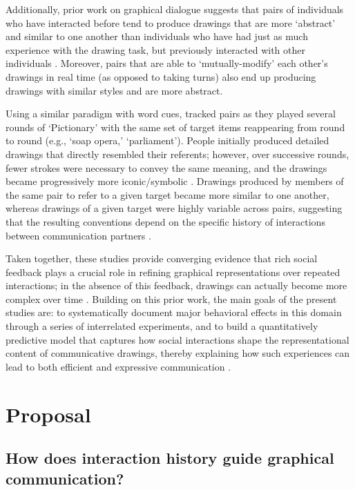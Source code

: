 \documentclass[12pt]{article}
\begin{document}
Additionally, prior work on graphical dialogue suggests that pairs of individuals who have interacted before tend to produce drawings that are more `abstract' and similar to one another than individuals who have had just as much experience with the drawing task, but previously interacted with other individuals \cite{Healey:2007vq}. Moreover, pairs that are able to `mutually-modify' each other's drawings in real time (as opposed to taking turns) also end up producing drawings with similar styles and are more abstract.  

Using a similar paradigm with word cues, \cite{Fay:2010jh} tracked pairs as they played several rounds of `Pictionary' with the same set of target items reappearing from round to round (e.g., `soap opera,' `parliament'). People initially produced detailed drawings that directly resembled their referents; however, over successive rounds, fewer strokes were necessary to convey the same meaning, and the drawings became progressively more iconic/symbolic \cite{Garrod:2007wk}. Drawings produced by members of the same pair to refer to a given target became more similar to one another, whereas drawings of a given target were highly variable across pairs, suggesting that the resulting conventions depend on the specific history of interactions between communication partners \cite{Fay:2010jh}.

Taken together, these studies provide converging evidence that rich social feedback plays a crucial role in refining graphical representations over repeated interactions; in the absence of this feedback, drawings can actually become more complex over time \cite{Garrod:2007wk,Hupet:1992ua}. Building on this prior work, the main goals of the present studies are: to systematically document major behavioral effects in this domain through a series of interrelated experiments, and to build a quantitatively predictive model that captures how social interactions shape the representational content of communicative drawings, thereby explaining how such experiences can lead to both efficient and expressive communication \cite{Kirby:2015gi}. 

\section{Proposal}

\subsection{How does interaction history guide graphical communication?}
\end{document}
